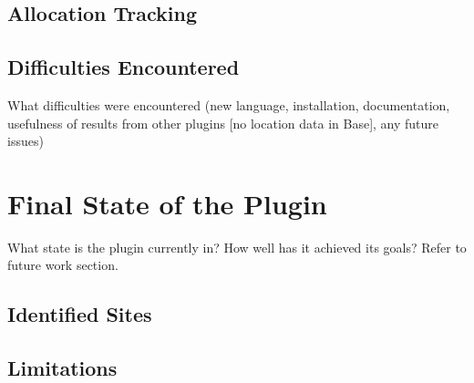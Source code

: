 \subsection{Allocation Tracking}


\subsection{Difficulties Encountered}

What difficulties were encountered (new language, installation, documentation, usefulness of results from other plugins [no location data in Base], any future issues)

\section{Final State of the Plugin}

What state is the plugin currently in? How well has it achieved its goals? Refer to future work section.

\subsection{Identified Sites}

\subsection{Limitations}
